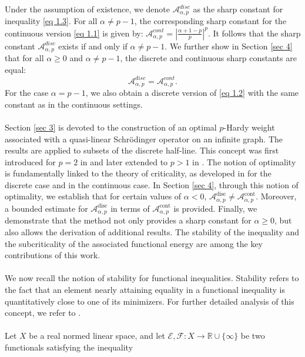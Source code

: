 \documentclass[11pt]{amsart}
\newcommand{\1}{[1]}
\begin{document}
Under the assumption of existence, we denote \(\mathcal{A}^{disc}_{\alpha,p}\) as the sharp constant for inequality \eqref{eq 1.3}. For all \(\alpha \neq  p - 1\), the corresponding sharp constant for the continuous version  \eqref{eq 1.1} is given by: \(\mathcal{A}^{cont}_{\alpha,p} = \left| \frac{\alpha + 1 - p}{p} \right|^p\). It follows that the sharp constant $\mathcal{A}^{disc}_{\alpha,p}$ exists if and only if $\alpha \neq p - 1$. We further show in Section \ref{sec 4} that for all $\alpha \geq 0$ and $\alpha \neq p - 1$, the discrete and continuous sharp constants are equal:  
$$ \mathcal{A}^{disc}_{\alpha,p} = 
 \mathcal{A}^{cont}_{\alpha,p}.   
$$
For the case $\alpha = p - 1$, we also obtain a discrete version of \eqref{eq 1.2} with the same constant as in the continuous settings.\\ \\
Section \ref{sec 3} is devoted to the construction of an optimal $p$-Hardy weight associated with a quasi-linear Schrödinger operator on an infinite graph. The results are applied to subsets of the discrete half-line. This concept was first introduced for $p = 2$ in \cite{KPP18} and later extended to $p > 1$ in \cite{Fis22}. The notion of optimality is fundamentally linked to the theory of criticality, as developed in \cite{KPP20,KPP18} for the discrete case and \cite{DP16} in the continuous case. In Section \ref{sec 4}, through this notion of optimality, we establish that for certain values of $\alpha < 0$, $\mathcal{A}_{\alpha, p}^{\text{disc}} \neq \mathcal{A}_{\alpha, p}^{\text{cont}}$. Moreover, a bounded estimate for $\mathcal{A}_{\alpha, p}^{\text{disc}}$ in terms of $\mathcal{A}_{\alpha, p}^{\text{cont}}$ is provided. 
Finally, we demonstrate that the method not only provides a sharp constant for $\alpha \geq 0$, but also allows the derivation of additional results. The stability of the inequality and the subcriticality of the associated functional energy are among the key contributions of this work. \\ \\ 
We now recall the notion of stability for functional inequalities. Stability refers to the fact that an element nearly attaining equality in a functional inequality is quantitatively close to one of its minimizers. For further detailed analysis of this concept, we refer to \cite{Car17,Fig12,Fig09,Fig10,FigInd13,FigMagPra13}. \\ \\
Let $X$ be a real normed linear space, and let \(\mathcal{E}, \mathcal{F}: X \rightarrow \mathbb{R}\cup \{\infty\} \) be two functionals satisfying the inequality
\end{document}
